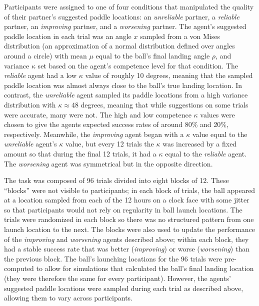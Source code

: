 \documentclass[10pt,letterpaper]{article}
\begin{document}
Participants were assigned to one of four conditions that manipulated the quality of their partner's suggested paddle locations: an \textit{unreliable} partner, a \textit{reliable} partner, an \textit{improving} partner, and a \textit{worsening} partner. The agent's
suggested paddle location in each trial was an angle $x$ sampled from a von Mises distribution (an approximation of a normal distribution defined over angles around a circle) with mean $\mu$ equal to the ball's final landing angle $\rho$, and variance $\kappa$ set based on the agent's competence level for that condition. The \textit{reliable} agent had a low $\kappa$ value of roughly 10 degrees, meaning that the sampled paddle location was almost always close to the ball's true landing location. In contrast, the \textit{unreliable} agent sampled its paddle locations from a high variance distribution with $\kappa \approx 48$ degrees, meaning that while suggestions on some trials were accurate, many were not. The high and low competence $\kappa$ values were chosen to give the agents expected success rates of around 80\% and 20\%, respectively. Meanwhile, the \textit{improving} agent began with a $\kappa$ value equal to the \textit{unreliable} agent's $\kappa$ value, but every 12 trials the $\kappa$ was increased by a fixed amount so that during the final 12 trials, it had a $\kappa$ equal to the \textit{reliable} agent. The \textit{worsening} agent was symmetrical but in the opposite direction.

The task was composed of 96 trials divided into eight blocks of 12. These ``blocks'' were not visible to participants; in each block of trials, the ball appeared at a location sampled from each of the 12 hours on a clock face with some jitter so that participants would not rely on regularity in ball launch locations. The trials were randomized in each block so there was no structured pattern from one launch location to the next. The blocks were also used to update the performance of the \textit{improving} and \textit{worsening} agents described above; within each block, they had a stable success rate that was better (\textit{improving}) or worse (\textit{worsening}) than the previous block. The ball's launching locations for the 96 trials were pre-computed to allow for simulations that calculated the ball's final landing location (they were therefore the same for every participant). However, the agents' suggested paddle locations were sampled during each trial as described above, allowing them to vary across participants. 
\end{document}
